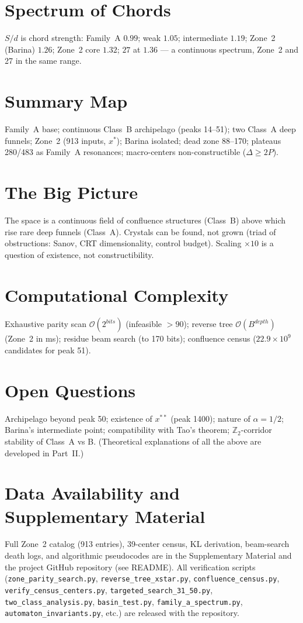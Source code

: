 \documentclass[12pt,a4paper]{article}
\theoremstyle{remark}
\begin{document}
\section{Spectrum of Chords}
$S/d$ is chord strength: Family~A $0.99$; weak $1.05$; intermediate $1.19$;
Zone~2 (Barina) $1.26$; Zone~2 core $1.32$; $27$ at $1.36$ --- a continuous
spectrum, Zone~2 and 27 in the same range.

\section{Summary Map}
Family~A base; continuous Class~B archipelago (peaks 14--51); two Class~A deep
funnels; Zone~2 (913 inputs, $x^*$); Barina isolated; dead zone 88--170;
plateaus 280/483 as Family~A resonances; macro-centers non-constructible
($\Delta\ge2P$).

\section{The Big Picture}
The space is a continuous field of confluence structures (Class~B) above which
rise rare deep funnels (Class~A). Crystals can be found, not grown (triad of
obstructions: Sanov, CRT dimensionality, control budget). Scaling $\times10$ is
a question of existence, not constructibility.

\section{Computational Complexity}
Exhaustive parity scan $\mathcal O(2^{bits})$ (infeasible $>90$); reverse tree
$\mathcal O(B^{depth})$ (Zone~2 in ms); residue beam search (to 170 bits);
confluence census ($22.9\times10^9$ candidates for peak 51).

\section{Open Questions}
Archipelago beyond peak 50; existence of $x^{**}$ (peak 1400); nature of
$\alpha=1/2$; Barina's intermediate point; compatibility with Tao's theorem;
$\mathbb Z_2$-corridor stability of Class~A vs B. (Theoretical explanations of
all the above are developed in Part~II.)

\section*{Data Availability and Supplementary Material}
Full Zone~2 catalog (913 entries), 39-center census, KL derivation, beam-search
death logs, and algorithmic pseudocodes are in the Supplementary Material and
the project GitHub repository (see README). All verification scripts
(\texttt{zone\_parity\_search.py}, \texttt{reverse\_tree\_xstar.py},
\texttt{confluence\_census.py}, \texttt{verify\_census\_centers.py},
\texttt{targeted\_search\_31\_50.py}, \texttt{two\_class\_analysis.py},
\texttt{basin\_test.py}, \texttt{family\_a\_spectrum.py},
\texttt{automaton\_invariants.py}, etc.) are released with the repository.
\end{document}
